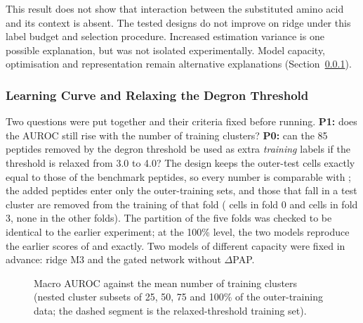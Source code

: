 \begin{table}[htbp]
  \centering
  \caption[Interaction designs against ridge M3]{Interaction designs against ridge M3. ``Criterion met'' applies the pre-registered rule above; for the
  sigmoid gate and the one-seed Degformer architecture the rule is applied descriptively.}\label{tab:e2}
  
\end{table}

This result does not show that interaction between the substituted amino acid and its context is absent.
The tested designs do not improve on ridge under this label budget and selection procedure. Increased
estimation variance is one possible explanation, but was not isolated experimentally. Model capacity,
optimisation and representation remain alternative explanations (Section~\ref{sec:res-curve}).

\subsubsection{Learning Curve and Relaxing the Degron Threshold}\label{sec:res-curve}
Two questions were put together and their criteria fixed before running. \textbf{P1:} does the AUROC still rise
with the number of training clusters? \textbf{P0:} can the 85 peptides removed by the degron threshold be
used as extra \emph{training} labels if the threshold is relaxed from 3.0 to 4.0? The design keeps the
outer-test cells exactly equal to those of the \nNPep{} benchmark peptides, so every number is comparable with
\nAucRidge{}; the added peptides enter only the outer-training sets, and those that fall in a test cluster
are removed from the training of that fold (\nExclFoldZero{} cells in fold 0 and \nExclFoldThree{} cells in fold 3,
none in the other folds). The partition of the five folds was checked to be identical to the earlier experiment; at the 100\% level, the two
models reproduce the earlier scores of \nAucRidge{} and \nAucGateNoPap{} exactly. Two models of different capacity
were fixed in advance: ridge M3 and the gated network without $\Delta$PAP.

\begin{figure}[htbp]
  \centering
  
  \caption[Macro AUROC against the mean number of training clusters]{Macro AUROC against the mean number of training clusters (nested cluster subsets of 25, 50, 75 and 100\%
  of the outer-training data; the dashed segment is the relaxed-threshold training set).}\label{fig:curve}
\end{figure}

